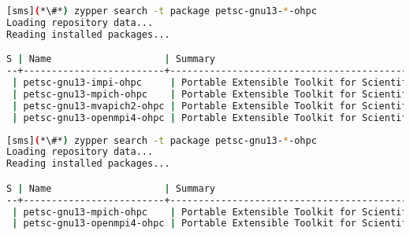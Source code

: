 \begin{lstlisting}[language=bash,keepspaces=true,keywords={}]
[sms](*\#*) zypper search -t package petsc-gnu13-*-ohpc
Loading repository data...
Reading installed packages...

S | Name                    | Summary
--+-------------------------+--------------------------------------------------------+--------
 | petsc-gnu13-impi-ohpc     | Portable Extensible Toolkit for Scientific Computation | package
 | petsc-gnu13-mpich-ohpc    | Portable Extensible Toolkit for Scientific Computation | package
 | petsc-gnu13-mvapich2-ohpc | Portable Extensible Toolkit for Scientific Computation | package
 | petsc-gnu13-openmpi4-ohpc | Portable Extensible Toolkit for Scientific Computation | package
\end{lstlisting}
\fi

\begin{lstlisting}[language=bash,keepspaces=true,keywords={}]
[sms](*\#*) zypper search -t package petsc-gnu13-*-ohpc
Loading repository data...
Reading installed packages...

S | Name                    | Summary
--+-------------------------+--------------------------------------------------------+--------
 | petsc-gnu13-mpich-ohpc    | Portable Extensible Toolkit for Scientific Computation | package
 | petsc-gnu13-openmpi4-ohpc | Portable Extensible Toolkit for Scientific Computation | package
\end{lstlisting}
\fi


